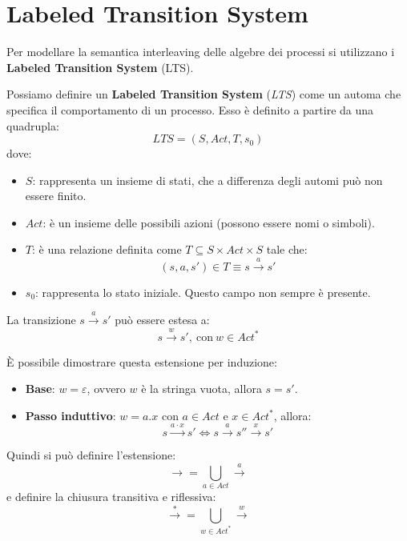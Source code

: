 \section{Labeled Transition System}
Per modellare la semantica interleaving delle algebre dei processi si utilizzano
i \textbf{Labeled Transition System} (LTS).
\begin{definizione}
    Possiamo definire un \textbf{Labeled Transition System} (\textit{LTS}) come
    un automa che specifica il comportamento di un processo. Esso è definito a
    partire da una quadrupla:
    \begin{equation}
        LTS = (S, Act, T, s_0)
    \end{equation}
    dove:
    \begin{itemize}
        \item \textbf{$S$}: rappresenta un insieme di stati, che a differenza
              degli automi può non essere finito.
        \item \textbf{$Act$}: è un insieme delle possibili azioni (possono essere
              nomi o simboli).
        \item \textbf{$T$}: è una relazione definita come
              $T \subseteq S \times Act \times S$ tale che:
              $$(s, a, s') \in T \equiv s \xrightarrow{a} s'$$
        \item \textbf{$s_0$}: rappresenta lo stato iniziale. Questo campo non
              sempre è presente.
    \end{itemize}
\end{definizione}
La transizione $s \xrightarrow{a} s'$ può essere estesa a:
\begin{equation}
    s \xrightarrow{w} s', \ \text{con} \ w \in Act^*
\end{equation}
\begin{dimostrazione}
    È possibile dimostrare questa estensione per induzione:
    \begin{itemize}
        \item \textbf{Base}: $w = \varepsilon$, ovvero $w$ è la stringa vuota,
              allora $s = s'$.
        \item \textbf{Passo induttivo}: $w = a . x$ con $a \in Act$ e
              $x \in Act^*$, allora:
              \begin{equation}
                  s \xrightarrow{a\cdot x} s' \iff s \xrightarrow{a} s''
                  \xrightarrow{x} s'
              \end{equation}
    \end{itemize}
\end{dimostrazione}
Quindi si può definire l'estensione:
\begin{equation}
    \xrightarrow{}  = \bigcup_{a \in Act} \xrightarrow{a}
\end{equation}
e definire la chiusura transitiva e riflessiva:
\begin{equation}
    \xrightarrow{\ast}  = \bigcup_{w \in Act^{\ast}} \xrightarrow{w}
\end{equation}
